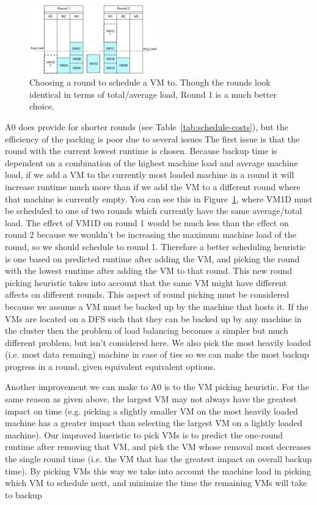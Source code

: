 \begin{figure}[thb]
\centering
\includegraphics[width=0.5\textwidth]{images/VMRound.pdf}
\caption{Choosing a round to schedule a VM to. Though the rounds look
identical in terms of total/average load, Round 1 is a much better choice.}
\label{fig:VMRound}
\end{figure}

A0 does provide for shorter rounds (see Table~\ref{tab:schedule-costs}), but
the efficiency of the packing is poor due to several issues
The first issue is that the round with the current lowest runtime
is chosen. Because backup time is dependent on a combination of the highest
machine load and average machine load, if we add a VM to the currently most
loaded machine in a round it will increase runtime much more than if we add the
VM to a different round where that machine is currently empty. You can see this
in Figure~\ref{fig:VMRound}, where VM1D must be scheduled to one of two rounds
which currently have the same average/total load. The effect of VM1D on round 1
would be much less than the effect on round 2 because we wouldn't be increasing
the maximum machine load of the round, so we should schedule to round 1.
Therefore a better
scheduling heuristic is one based on predicted runtime after adding the VM, and
picking the round with the lowest runtime after adding the VM to that round.
This new round picking heuristic
takes into account that the same VM might have different affects on different
rounds. This aspect of round picking must be considered because we assume a VM
must be backed
up by the machine that hosts it. If the VMs are located on a DFS such that they
can be
backed up by any machine in the cluster then the problem of load balancing
becomes a simpler but much different problem, but isn't considered here. We
also pick the most heavily loaded (i.e. most data remaing) machine in case of
ties so we can make the most backup progress in a round, given equivalent
equivalent options.

Another improvement we can make to A0 is to the VM picking heuristic. For the
same reason as given above, the largest VM may not always have the greatest
impact on time (e.g. picking a slightly smaller VM on the most heavily loaded
machine has a greater impact than selecting the largest VM on a lightly loaded
machine). Our improved hueristic to pick VMs is to predict the one-round
runtime after removing that VM, and pick the VM whose removal most
decreases the single round time (i.e. the VM that has the greatest impact on
overall backup time). By picking VMs this way we take into account
the machine load in picking which VM to schedule next, and minimize the time
the remaining VMs will take to backup

